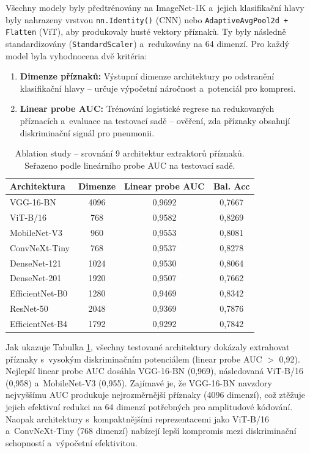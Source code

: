 \documentclass[12pt, a4paper]{report}
\begin{document}
Všechny modely byly předtrénovány na ImageNet-1K a~jejich klasifikační hlavy byly nahrazeny vrstvou \texttt{nn.Identity()} (CNN) nebo \texttt{AdaptiveAvgPool2d + Flatten} (ViT), aby produkovaly husté vektory příznaků. Ty byly následně standardizovány (\texttt{StandardScaler}) a~redukovány na 64 dimenzí. Pro každý model byla vyhodnocena dvě kritéria:

\begin{enumerate}
    \item \textbf{Dimenze příznaků:} Výstupní dimenze architektury po odstranění klasifikační hlavy -- určuje výpočetní náročnost a~potenciál pro kompresi.
    \item \textbf{Linear probe AUC:} Trénování logistické regrese na redukovaných příznacích a~evaluace na testovací sadě -- ověření, zda příznaky obsahují diskriminační signál pro pneumonii.
\end{enumerate}

\begin{table}[htbp]
    \centering
    \caption{Ablation study -- srovnání 9 architektur extraktorů příznaků. Seřazeno podle lineárního probe AUC na testovací sadě.}
    \label{tab:backbone_comparison}
    \small
    \renewcommand{\arraystretch}{1.2}
    \begin{tabular}{|l|c|c|c|}
        \hline
        \textbf{Architektura} & \textbf{Dimenze} & \textbf{Linear probe AUC} & \textbf{Bal. Acc} \\
        \hline
        VGG-16-BN        & 4096 & 0,9692 & 0,7667 \\
        ViT-B/16         & 768  & 0,9582 & 0,8269 \\
        MobileNet-V3     & 960  & 0,9553 & 0,8081 \\
        ConvNeXt-Tiny    & 768  & 0,9537 & 0,8278 \\
        DenseNet-121     & 1024 & 0,9530 & 0,8064 \\
        DenseNet-201     & 1920 & 0,9507 & 0,7662 \\
        EfficientNet-B0  & 1280 & 0,9469 & 0,8342 \\
        ResNet-50        & 2048 & 0,9369 & 0,7876 \\
        EfficientNet-B4  & 1792 & 0,9292 & 0,7842 \\
        \hline
    \end{tabular}
\end{table}

Jak ukazuje Tabulka \ref{tab:backbone_comparison}, všechny testované architektury dokázaly extrahovat příznaky s~vysokým diskriminačním potenciálem (linear probe AUC $>$ 0,92). Nejlepší linear probe AUC dosáhla VGG-16-BN (0,969), následovaná ViT-B/16 (0,958) a~MobileNet-V3 (0,955). Zajímavé je, že VGG-16-BN navzdory nejvyššímu AUC produkuje nejrozměrnější příznaky (4096 dimenzí), což ztěžuje jejich efektivní redukci na 64 dimenzí potřebných pro amplitudové kódování. Naopak architektury s~kompaktnějšími reprezentacemi jako ViT-B/16 a~ConvNeXt-Tiny (768 dimenzí) nabízejí lepší kompromis mezi diskriminační schopností a~výpočetní efektivitou.
\end{document}
